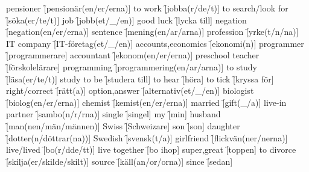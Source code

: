 \begin{questions}
\begin{multicols}{2}
        \question pensioner \f[pensionär(en/er/erna)]
        \question to work \f[jobba(r/de/t)]
        \question to search/look for \f[söka(er/te/t)]
        \question job \f[jobb(et/\_/en)]
        \question good luck \f[lycka till]
        \question negation \f[negation(en/er/erna)]
        \question sentence \f[mening(en/ar/arna)]
        \question profession \f[yrke(t/n/na)]
        \question IT company \f[IT-företag(et/\_/en)]
        \question accounts,economics \f[ekonomi(n)]
        \question programmer \f[programmerare]
        \question accountant \f[ekonom(en/er/erna)]
        \question preschool teacher \f[förskolelärare]
        \question programming \f[programmering(en/ar/arna)]
        \question to study \f[läsa(er/te/t)]
        \question study to be \f[studera till]
        \question to hear \f[höra]
        \question to tick \f[kryssa för]
        \question right/correct \f[rätt(a)]
        \question option,answer \f[alternativ(et/\_/en)]
        \question biologist \f[biolog(en/er/erna)]
        \question chemist \f[kemist(en/er/erna)]
        \question married \f[gift(\_/a)]
        \question live-in partner \f[sambo(n/r/rna)]
        \question single \f[singel]
        \question my \f[min]
        \question husband \f[man(nen/män/männen)]
        \question Swiss \f[Schweizare]
        \question son \f[son]
        \question daughter \f[dotter(n/döttrar(na))]
        \question Swedish \f[svensk(t/a)]
        \question girlfriend \f[flickvän(ner/nerna)]
        \question live/lived \f[bo(r/dde/tt)]
        \question live together \f[bo ihop]
        \question super,great \f[toppen]
        \question to divorce \f[skilja(er/skilde/skilt)]
        \question source \f[käll(an/or/orna)]
        \question since \f[sedan]
    \end{multicols}
\end{questions}
